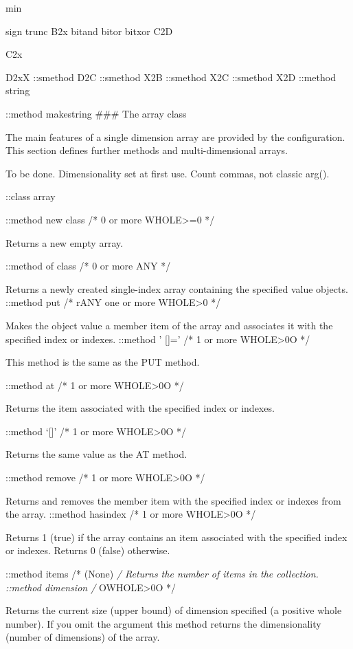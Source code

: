 min

sign trunc B2x bitand bitor bitxor C2D

C2x

D2xX ::smethod D2C ::smethod X2B ::smethod X2C ::smethod X2D ::method
string

::method makestring \#\#\# The array class

The main features of a single dimension array are provided by the
configuration. This section defines further methods and
multi-dimensional arrays.

To be done. Dimensionality set at first use. Count commas, not classic
arg().

::class array

::method new class /* 0 or more WHOLE\textgreater=0 */

Returns a new empty array.

::method of class /* 0 or more ANY */

Returns a newly created single-index array containing the specified
value objects. ::method put /* rANY one or more WHOLE\textgreater0 */

Makes the object value a member item of the array and associates it with
the specified index or indexes. ::method ' {[}{]}=' /* 1 or more
WHOLE\textgreater0O */

This method is the same as the PUT method.

::method at /* 1 or more WHOLE\textgreater0O */

Returns the item associated with the specified index or indexes.

::method `{[}{]}' /* 1 or more WHOLE\textgreater0O */

Returns the same value as the AT method.

::method remove /* 1 or more WHOLE\textgreater0O */

Returns and removes the member item with the specified index or indexes
from the array. ::method hasindex /* 1 or more WHOLE\textgreater0O */

Returns 1 (true) if the array contains an item associated with the
specified index or indexes. Returns 0 (false) otherwise.

::method items /* (None) \emph{/ Returns the number of items in the
collection. ::method dimension /} OWHOLE\textgreater0O */

Returns the current size (upper bound) of dimension specified (a
positive whole number). If you omit the argument this method returns the
dimensionality (number of dimensions) of the array.


